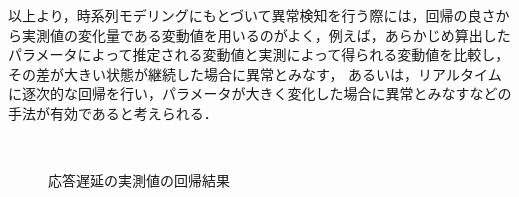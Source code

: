 \documentclass[technicalreport]{ieicej}
\begin{document}
以上より，時系列モデリングにもとづいて異常検知を行う際には，回帰の良さから実測値の変化量である変動値を用いるのがよく，例えば，あらかじめ算出したパラメータによって推定される変動値と実測によって得られる変動値を比較し，その差が大きい状態が継続した場合に異常とみなす，
あるいは，リアルタイムに逐次的な回帰を行い，パラメータが大きく変化した場合に異常とみなすなどの手法が有効であると考えられる．

\begin{figure}[tb]
\begin{center}
~
~
\caption{応答遅延の実測値の回帰結果}
\label{norm-reg}
\end{center}
\end{figure}
\end{document}
